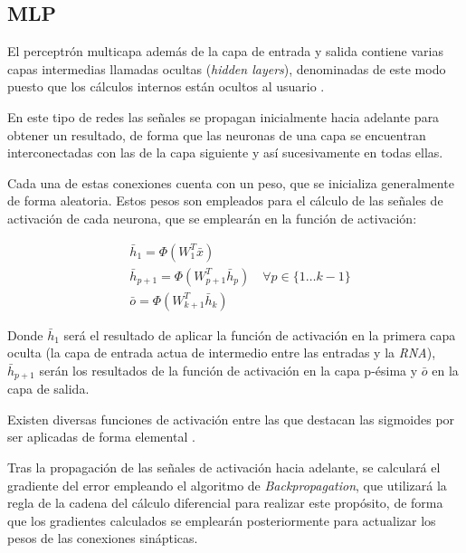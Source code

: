 \subsection{MLP}
El perceptrón multicapa además de la capa de entrada y salida contiene varias capas intermedias
llamadas ocultas (\textit{hidden layers}), denominadas de este modo puesto que los cálculos
internos están ocultos al usuario \cite{book:aggarwal2018}.

En este tipo de redes las señales se propagan inicialmente hacia adelante para obtener un resultado, 
de forma que las neuronas de una capa se encuentran interconectadas con las de la capa
siguiente y así sucesivamente en todas ellas.

Cada una de estas conexiones cuenta con un peso, que se inicializa generalmente de forma aleatoria. Estos pesos son
empleados para el cálculo de las señales de activación de cada neurona, que se emplearán en la función de activación:

\begin{equation}
    \begin{aligned}
    & \bar{h}_1=\Phi\left(W_1^T \bar{x}\right) \\
    & \bar{h}_{p+1}=\Phi\left(W_{p+1}^T \bar{h}_p\right) \quad \forall p \in\{1 \ldots k-1\}\\
    & \bar{o}=\Phi\left(W_{k+1}^T \bar{h}_k\right)
    \end{aligned}
\end{equation}

Donde \begin{math}\bar{h}_1\end{math} será el resultado de aplicar la función de activación en la primera capa oculta (la capa de entrada
actua de intermedio entre las entradas y la \textit{RNA}), \begin{math}\bar{h}_{p+1}\end{math} serán los resultados de la función de activación
en la capa p-ésima y \begin{math}\bar{o}\end{math} en la capa de salida.


Existen diversas funciones de activación entre las que destacan las sigmoides por ser aplicadas de forma 
elemental \cite{book:aggarwal2018}.

Tras la propagación de las señales de activación hacia adelante, se calculará el gradiente del error empleando el algoritmo
de \textit{Backpropagation}, que utilizará la regla de la cadena del cálculo diferencial para realizar este propósito, de forma 
que los gradientes calculados se emplearán posteriormente para actualizar los pesos de las conexiones sinápticas.

